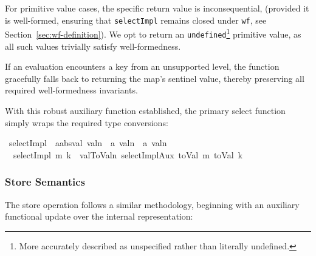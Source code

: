 \documentclass[11pt]{article}
\begin{document}
For primitive value cases, the specific return value is inconsequential, (provided it is well-formed, ensuring that \texttt{selectImpl} remains closed under \texttt{wf}, see Section~\ref{sec:wf-definition}).
We opt to return an \texttt{undefined}\footnote{More accurately described as unspecified rather than literally undefined.} primitive value, as all such values trivially satisfy well-formedness.

If an evaluation encounters a key from an unsupported level, the function gracefully falls back to returning the map's sentinel value, thereby preserving all required well-formedness invariants.

With this robust auxiliary function established, the primary select function simply wraps the required type conversions:

\begin{isabellebody}
\isanewline
{}\isamarkupfalse%
\ selectImpl\ {\isacharcolon}{\kern0pt}{\isacharcolon}{\kern0pt}\ {\isachardoublequoteopen}{\isacharprime}{\kern0pt}a{\isacharcolon}{\kern0pt}{\isacharcolon}{\kern0pt}absval\ valn\ {\isasymRightarrow}\ {\isacharprime}{\kern0pt}a\ valn\ {\isasymRightarrow}\ {\isacharprime}{\kern0pt}a\ valn{\isachardoublequoteclose}\ \isanewline
\ \ {\isachardoublequoteopen}selectImpl\ m\ k\ {\isacharequal}{\kern0pt}\ val{}ToValn\ {\isacharparenleft}{\kern0pt}selectImplAux\ {\isacharparenleft}{\kern0pt}toVal{}{}{}{}\ m{\isacharparenright}{\kern0pt}\ {\isacharparenleft}{\kern0pt}toVal{}{}{}{}\ k{\isacharparenright}{\kern0pt}{\isacharparenright}{\kern0pt}{\isachardoublequoteclose}\end{isabellebody}


\subsubsection{Store Semantics}
\label{sec:store}

The store operation follows a similar methodology, beginning with an auxiliary functional update over the internal representation:
\end{document}

